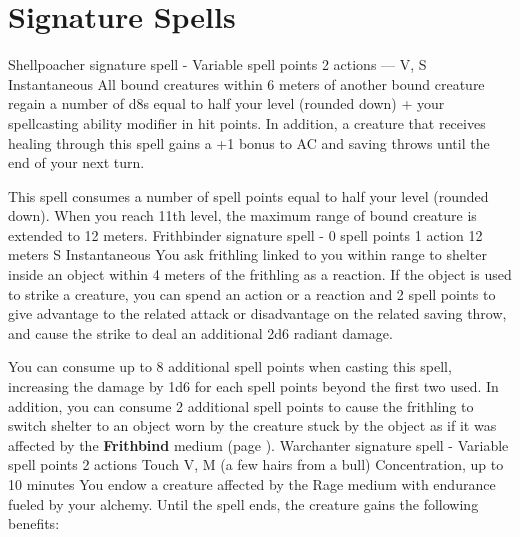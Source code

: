\section{Signature Spells} \label{sec::signaturespells}
    {Shellpoacher signature spell - Variable spell points}
    {2 actions}
    {---}
    {V, S}
    {Instantaneous}
    All bound creatures within 6 meters of another bound creature regain a number of d8s equal to half your level (rounded down) + your spellcasting ability modifier in hit points.
    In addition, a creature that receives healing through this spell gains a +1 bonus to AC and saving throws until the end of your next turn.

    This spell consumes a number of spell points equal to half your level (rounded down).
    When you reach 11th level, the maximum range of bound creature is extended to 12 meters.
    {Frithbinder signature spell - 0 spell points}
    {1 action}
    {12 meters}
    {S}
    {Instantaneous}
    You ask frithling linked to you within range to shelter inside an object within 4 meters of the frithling as a reaction.
    If the object is used to strike a creature, you can spend an action or a reaction and 2 spell points to give advantage to the related attack or disadvantage on the related saving throw, and cause the strike to deal an additional 2d6 radiant damage.

    You can consume up to 8 additional spell points when casting this spell, increasing the damage by 1d6 for each spell points beyond the first two used.
    In addition, you can consume 2 additional spell points to cause the frithling to switch shelter to an object worn by the creature stuck by the object as if it was affected by the \textbf{Frithbind} medium (page \pageref{medium::frithbind}).
    {Warchanter signature spell - Variable spell points}
    {2 actions}
    {Touch}
    {V, M (a few hairs from a bull)}
    {Concentration, up to 10 minutes}
    You endow a creature affected by the Rage medium with endurance fueled by your alchemy.
    Until the spell ends, the creature gains the following benefits:

